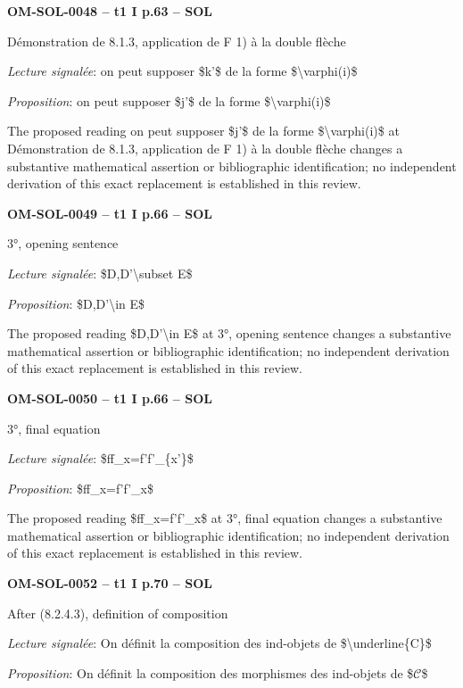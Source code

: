 \par\noindent\textbf{OM-SOL-0048 -- t1 I p.63 -- SOL}\par
Démonstration de 8.1.3, application de F 1) à la double flèche\par
\emph{Lecture signalée}: on peut supposer \$k'\$ de la forme \$\textbackslash{}varphi(i)\$\par
\emph{Proposition}: on peut supposer \$j'\$ de la forme \$\textbackslash{}varphi(i)\$\par
The proposed reading on peut supposer \$j'\$ de la forme \$\textbackslash{}varphi(i)\$ at Démonstration de 8.1.3, application de F 1) à la double flèche changes a substantive mathematical assertion or bibliographic identification; no independent derivation of this exact replacement is established in this review.\par
\par\noindent\textbf{OM-SOL-0049 -- t1 I p.66 -- SOL}\par
3°, opening sentence\par
\emph{Lecture signalée}: \$D,D'\textbackslash{}subset E\$\par
\emph{Proposition}: \$D,D'\textbackslash{}in E\$\par
The proposed reading \$D,D'\textbackslash{}in E\$ at 3°, opening sentence changes a substantive mathematical assertion or bibliographic identification; no independent derivation of this exact replacement is established in this review.\par
\par\noindent\textbf{OM-SOL-0050 -- t1 I p.66 -- SOL}\par
3°, final equation\par
\emph{Lecture signalée}: \$ff\_x=\allowbreak f'f'\_\{x'\}\$\par
\emph{Proposition}: \$ff\_x=\allowbreak f'f'\_x\$\par
The proposed reading \$ff\_x=\allowbreak f'f'\_x\$ at 3°, final equation changes a substantive mathematical assertion or bibliographic identification; no independent derivation of this exact replacement is established in this review.\par
\par\noindent\textbf{OM-SOL-0052 -- t1 I p.70 -- SOL}\par
After (8.2.4.3), definition of composition\par
\emph{Lecture signalée}: On définit la composition des ind-objets de \$\textbackslash{}underline\{C\}\$\par
\emph{Proposition}: On définit la composition des morphismes des ind-objets de \$\ensuremath{𝒞}\$\par
